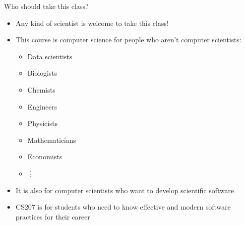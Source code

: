 \documentclass[onlymath, nologo]{beamer}
\begin{document}
  \begin{frame}{Who should take this class?}
    \begin{itemize}
      \item Any kind of scientist is welcome to take this class! \\[1.0em]
      \item This course is computer science for people who aren't computer scientists:
      \begin{itemize}
        \item Data scientists
        \item Biologists
        \item Chemists
        \item Engineers 
        \item Physicists
        \item Mathematicians
        \item Economists
        \item \hspace{2.0em} \vdots %
      \end{itemize}
      \item It is also for computer scientists who want to develop scientific software \\[1.0em]
      \item CS207 is for students who need to know effective and modern software practices for 
            their career
    \end{itemize}
  \end{frame}
\end{document}
